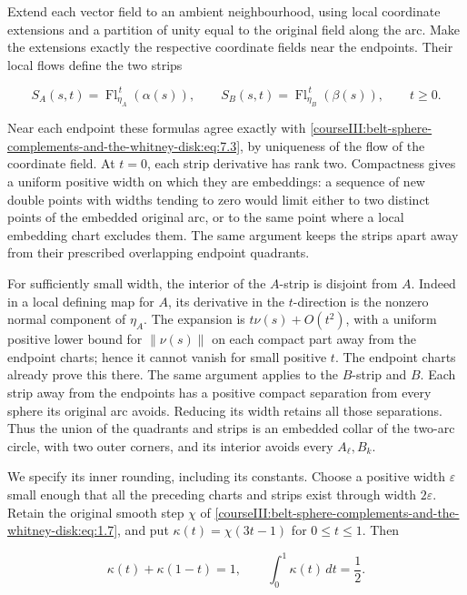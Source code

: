 Extend each vector field to an ambient neighbourhood, using local coordinate extensions and a partition of unity equal to the original field along the arc. Make the extensions exactly the respective coordinate fields near the endpoints. Their local flows define the two strips

\begin{equation}
S_A(s,t)=\operatorname{Fl}^{\,t}_{\eta_A}(\alpha(s)),\qquad
S_B(s,t)=\operatorname{Fl}^{\,t}_{\eta_B}(\beta(s)),\qquad t\geq0.
\label{courseIII:belt-sphere-complements-and-the-whitney-disk:eq:7.4}
\end{equation}

Near each endpoint these formulas agree exactly with \eqref{courseIII:belt-sphere-complements-and-the-whitney-disk:eq:7.3}, by uniqueness of the flow of the coordinate field. At \(t=0\), each strip derivative has rank two. Compactness gives a uniform positive width on which they are embeddings: a sequence of new double points with widths tending to zero would limit either to two distinct points of the embedded original arc, or to the same point where a local embedding chart excludes them. The same argument keeps the strips apart away from their prescribed overlapping endpoint quadrants.

For sufficiently small width, the interior of the \(A\)-strip is disjoint from \(A\). Indeed in a local defining map for \(A\), its derivative in the \(t\)-direction is the nonzero normal component of \(\eta_A\). The expansion is \(t\nu(s)+O(t^2)\), with a uniform positive lower bound for \(\|\nu(s)\|\) on each compact part away from the endpoint charts; hence it cannot vanish for small positive \(t\). The endpoint charts already prove this there. The same argument applies to the \(B\)-strip and \(B\). Each strip away from the endpoints has a positive compact separation from every sphere its original arc avoids. Reducing its width retains all those separations. Thus the union of the quadrants and strips is an embedded collar of the two-arc circle, with two outer corners, and its interior avoids every \(A_\ell,B_k\).

We specify its inner rounding, including its constants. Choose a positive width \(\varepsilon\) small enough that all the preceding charts and strips exist through width \(2\varepsilon\). Retain the original smooth step \(\chi\) of \eqref{courseIII:belt-sphere-complements-and-the-whitney-disk:eq:1.7}, and put
\(\kappa(t)=\chi(3t-1)\) for \(0\leq t\leq1\). Then

\begin{equation}
\kappa(t)+\kappa(1-t)=1,\qquad
\int_0^1\kappa(t)\,dt=\frac12.
\label{courseIII:belt-sphere-complements-and-the-whitney-disk:eq:7.5}
\end{equation}

